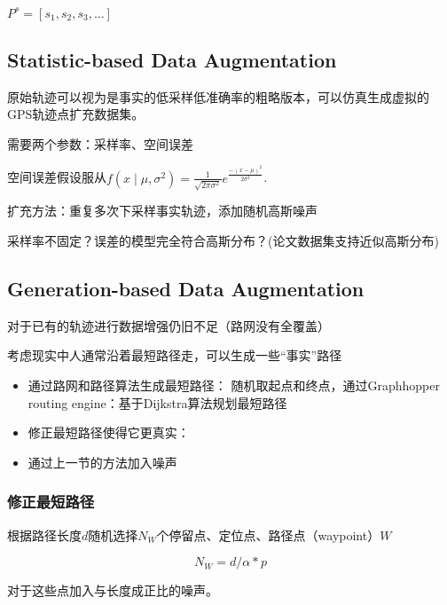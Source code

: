 \begin{definition}[基于路段的轨迹]
    $ P^{s}=\left[s_{1}, s_{2}, s_{3}, \ldots\right] $
\end{definition}

\subsection{Statistic-based Data Augmentation}

原始轨迹可以视为是事实的低采样低准确率的粗略版本，可以仿真生成虚拟的GPS轨迹点扩充数据集。

需要两个参数：采样率、空间误差

空间误差假设服从$ f\left(x \mid \mu, \sigma^{2}\right)=\frac{1}{\sqrt{2 \pi \sigma^{2}}} e^{\frac{-(x-\mu)^{2}}{2 \sigma^{2}}} $.

扩充方法：重复多次下采样事实轨迹，添加随机高斯噪声

\begin{remark}
    采样率不固定？误差的模型完全符合高斯分布？(论文数据集支持近似高斯分布)
\end{remark}

\subsection{Generation-based Data Augmentation}

对于已有的轨迹进行数据增强仍旧不足（路网没有全覆盖）

考虑现实中人通常沿着最短路径走，可以生成一些“事实”路径

\begin{itemize}
    \item 通过路网和路径算法生成最短路径： 随机取起点和终点，通过Graphhopper routing engine：基于Dijkstra算法规划最短路径
    \item 修正最短路径使得它更真实：
    \item 通过上一节的方法加入噪声
\end{itemize}

\subsubsection{修正最短路径}

根据路径长度$d$随机选择$N_W$个停留点、定位点、路径点（waypoint）$W$

\begin{equation} N_{W}=d / \alpha * p \end{equation}

对于这些点加入与长度成正比的噪声。

